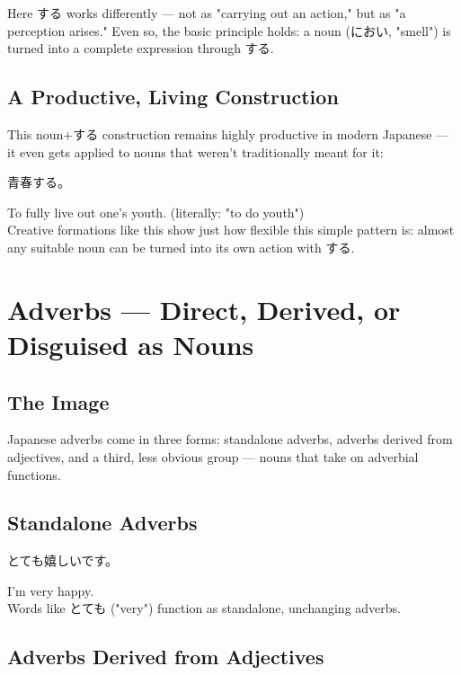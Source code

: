\documentclass[12pt]{book}
\begin{document}
Here する works differently — not as "carrying out an action," but as "a perception arises." Even so, the basic principle holds: a noun (におい, "smell") is turned into a complete expression through する.

\section*{A Productive, Living Construction}

This noun+する construction remains highly productive in modern Japanese — it even gets applied to nouns that weren't traditionally meant for it:

\par\quad 青春する。\\
\par\quad To fully live out one's youth. (literally: "to do youth")\\

Creative formations like this show just how flexible this simple pattern is: almost any suitable noun can be turned into its own action with する.


\chapter{Adverbs — Direct, Derived, or Disguised as Nouns}

\section*{The Image}

Japanese adverbs come in three forms: standalone adverbs, adverbs derived from adjectives, and a third, less obvious group — nouns that take on adverbial functions.

\section*{Standalone Adverbs}

\par\quad とても嬉しいです。\\
\par\quad I'm very happy.\\

Words like とても ("very") function as standalone, unchanging adverbs.

\section*{Adverbs Derived from Adjectives}
\end{document}
